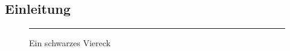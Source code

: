 
\begin{refsection}
\chapter{Einleitung}

\cite{Bulanov2012}

\begin{figure}[h]\centering
\rule{6cm}{4cm}
\caption{Ein schwarzes Viereck}
\end{figure}

\blindtext[10]

\blindtext[10]

 \printbibliography
 \end{refsection}

